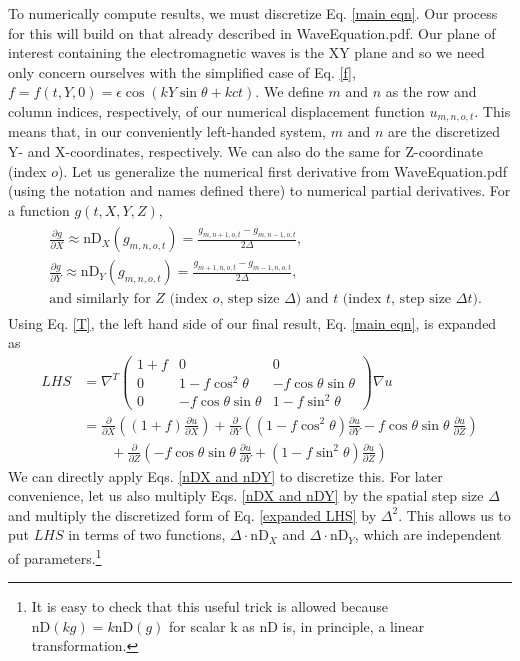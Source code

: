 \documentclass{article}
\begin{document}
To numerically compute results, we must discretize Eq. \ref{main eqn}. Our process for this will build on that already described in WaveEquation.pdf. Our plane of interest containing the electromagnetic waves is the XY plane and so we need only concern ourselves with the simplified case of Eq. \ref{f}, $f=f(t,Y,0)=\epsilon \cos(kY\sin\theta+kct).$ We define $m$ and $n$ as the row and column indices, respectively, of our numerical displacement function $u_{m,n,o,t}$. This means that, in our conveniently left-handed system, $m$ and $n$ are the discretized Y- and X-coordinates, respectively. We can also do the same for Z-coordinate (index $o$). Let us generalize the numerical first derivative from WaveEquation.pdf (using the notation and names defined there) to numerical partial derivatives. For a function $g(t,X,Y,Z)$,
\begin{align} \label{nDX and nDY}
\begin{split}
&\frac{\partial g}{\partial X} \approx \mbox{nD}_X(g_{m,n,o,t})=\frac{g_{m,n+1,o,t}-g_{m,n-1,o,t}}{2\Delta}, \\ 
&\frac{\partial g}{\partial Y} \approx \mbox{nD}_Y(g_{m,n,o,t})=\frac{g_{m+1,n,o,t}-g_{m-1,n,o,t}}{2\Delta}, \\
&\text{and similarly for $Z$ (index $o$, step size $\Delta$) and $t$ (index $t$, step size $\Delta t$).}
\end{split}
\end{align}
Using Eq. \ref{T}, the left hand side of our final result, Eq. \ref{main eqn}, is expanded as
\begin{align} \label{expanded LHS}
LHS &=
\nabla^T \begin{pmatrix}
1+f & 0 & 0 \\
0 & 1-f\cos^2\theta & -f\cos\theta\sin\theta \\
0 & -f\cos\theta\sin\theta & 1-f\sin^2\theta
\end{pmatrix} \nabla u \nonumber \\
&=
\frac{\partial}{\partial X}\left((1+f)\frac{\partial u}{\partial X}\right)+\frac{\partial}{\partial Y}\left((1-f\cos^2\theta)\frac{\partial u}{\partial Y}-f\cos\theta\sin\theta\ \frac{\partial u}{\partial Z} \right)\\ 
&\qquad+\frac{\partial}{\partial Z}\left(-f\cos\theta\sin\theta\ \frac{\partial u}{\partial Y} + (1-f\sin^2\theta)\frac{\partial u}{\partial Z}\right) \nonumber
\end{align}
We can directly apply Eqs. \ref{nDX and nDY} to discretize this. For later convenience, let us also multiply Eqs. \ref{nDX and nDY} by the spatial step size $\Delta$ and multiply the discretized form of Eq. \ref{expanded LHS} by $\Delta^2$. This allows us to put $LHS$ in terms of two functions, $\Delta\cdot\mbox{nD}_X$ and $\Delta\cdot\mbox{nD}_Y$, which are independent of parameters.\footnote{It is easy to check that this useful trick is allowed because $\mbox{nD}(kg)=k\mbox{nD}(g)$ for scalar k as $\mbox{nD}$ is, in principle, a linear transformation.}
\end{document}
